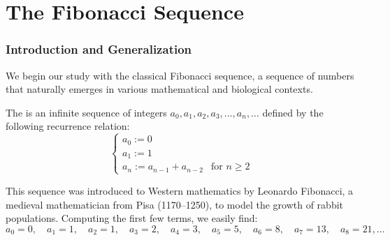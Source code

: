 \renewcommand{\thetheorem}{1.\arabic{theorem}}
\setcounter{theorem}{0}
\setcounter{chapter}{0}
%

\chapter{The Fibonacci Sequence}
\subsection{Introduction and Generalization}

We begin our study with the classical Fibonacci sequence, a sequence of numbers that naturally emerges in various mathematical and biological contexts.

\begin{definition}
\label{def:classical_fibonacci}
The  is an infinite sequence of integers $a_0, a_1, a_2, a_3, \dots, a_n, \dots$ defined by the following recurrence relation:
\begin{equation} \label{eq:standard_fib_recurrence}
\begin{cases}
a_0 := 0 \\
a_1 := 1 \\
a_n := a_{n-1} + a_{n-2} & \text{for } n \ge 2
\end{cases}
\end{equation}
\end{definition}

\begin{remark}
This sequence was introduced to Western mathematics by Leonardo Fibonacci, a medieval mathematician from Pisa (1170--1250), to model the growth of rabbit populations. Computing the first few terms, we easily find:
\[
a_0 = 0, \quad a_1 = 1, \quad a_2 = 1, \quad a_3 = 2, \quad a_4 = 3, \quad a_5 = 5, \quad a_6 = 8, \quad a_7 = 13, \quad a_8 = 21, \dots
\]
\end{remark}

